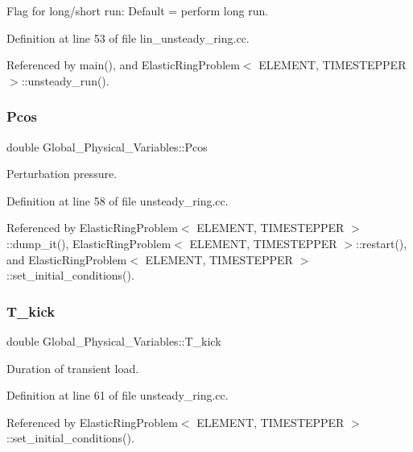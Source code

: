Flag for long/short run\+: Default = perform long run. 



Definition at line 53 of file lin\+\_\+unsteady\+\_\+ring.\+cc.



Referenced by main(), and Elastic\+Ring\+Problem$<$ E\+L\+E\+M\+E\+N\+T, T\+I\+M\+E\+S\+T\+E\+P\+P\+E\+R $>$\+::unsteady\+\_\+run().

\mbox{\label{namespaceGlobal__Physical__Variables_ab55734aaa66260cd9d4bf68a4ecafdd5}} 
\subsubsection{\texorpdfstring{Pcos}{Pcos}}
{\footnotesize\ttfamily double Global\+\_\+\+Physical\+\_\+\+Variables\+::\+Pcos}



Perturbation pressure. 



Definition at line 58 of file unsteady\+\_\+ring.\+cc.



Referenced by Elastic\+Ring\+Problem$<$ E\+L\+E\+M\+E\+N\+T, T\+I\+M\+E\+S\+T\+E\+P\+P\+E\+R $>$\+::dump\+\_\+it(), Elastic\+Ring\+Problem$<$ E\+L\+E\+M\+E\+N\+T, T\+I\+M\+E\+S\+T\+E\+P\+P\+E\+R $>$\+::restart(), and Elastic\+Ring\+Problem$<$ E\+L\+E\+M\+E\+N\+T, T\+I\+M\+E\+S\+T\+E\+P\+P\+E\+R $>$\+::set\+\_\+initial\+\_\+conditions().

\mbox{\label{namespaceGlobal__Physical__Variables_a8a2c0589daf61085e7ebec410cbbbc76}} 
\subsubsection{\texorpdfstring{T\+\_\+kick}{T\_kick}}
{\footnotesize\ttfamily double Global\+\_\+\+Physical\+\_\+\+Variables\+::\+T\+\_\+kick}



Duration of transient load. 



Definition at line 61 of file unsteady\+\_\+ring.\+cc.



Referenced by Elastic\+Ring\+Problem$<$ E\+L\+E\+M\+E\+N\+T, T\+I\+M\+E\+S\+T\+E\+P\+P\+E\+R $>$\+::set\+\_\+initial\+\_\+conditions().

